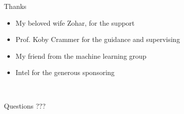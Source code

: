\documentclass{beamer}
\begin{document}
\begin{frame}{Thanks }
\begin{itemize}
\item My beloved wife Zohar, for the support\newline
\item Prof. Koby Crammer for  the guidance and  supervising\newline
\item My friend  from the machine learning group\newline
\item Intel  for the generous sponsoring
\end{itemize}

\end{frame}

\begin{frame}{~}
\begin{center}
\begin{Huge}Questions ???\end{Huge}
\end{center}
\end{frame}
\end{document}
